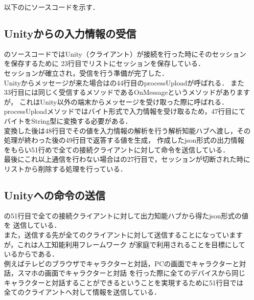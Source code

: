 以下のにソースコードを示す．\\





\subsection{Unityからの入力情報の受信}
のソースコードではUnity（クライアント）が接続を行った時にそのセッションを保存するために
23行目でリストにセッションを保存している．\\

セッションが確立され，受信を行う準備が完了した．\\

Unityからメッセージが来た場合はの44行目のprocessUploadが呼ばれる．
また33行目には同じく受信するメソッドであるOnMessageというメソッドがありますが，
これはUnity以外の端末からメッセージを受け取った際に呼ばれる．\\

processUploadメソッドではバイト形式で入力情報を受け取るため，47行目にてバイトをString型に変換する必要がある．\\
変換した後は48行目でその値を入力情報の解析を行う解析知能ハブへ渡し，その処理が終わった後の49行目で返答する値を生成，
作成したjson形式の出力情報をもらい51行めで全ての接続クライアントに対して命令を送信している．\\



最後にこれ以上通信を行わない場合はの27行目で，セッションが切断された時に
リストから削除する処理を行っている．\\


\subsection{Unityへの命令の送信}
の51行目で全ての接続クライアントに対して出力知能ハブから得たjson形式の値を
送信している．\\

また，送信する先が全てのクライアントに対して送信することになっていますが，これは人工知能利用フレームワーク
が家庭で利用されることを目標にしているからである．\\

例えばテレビのブラウザでキャラクターと対話，PCの画面でキャラクターと対話，スマホの画面でキャラクターと対話
を行った際に全てのデバイスから同じキャラクターと対話することができるということを実現するために51行目では
全てのクライアントへ対して情報を送信している．\\

